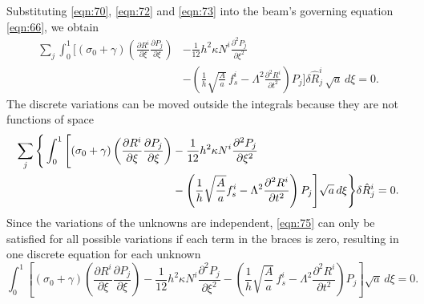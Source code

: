 \documentclass[12pt,MSc,twoside]{muthesis_2020}
\begin{document}
Substituting \eqref{eqn:70}, \eqref{eqn:72} and \eqref{eqn:73} into the beam's governing equation \eqref{eqn:66}, we obtain 
\begin{equation}
	\label{eqn:74}
    \begin{aligned}
	\sum_j\int^1_0 \Bigg[(\sigma_0+\gamma)\left(\frac{\partial R^i}{\partial\xi}\frac{\partial P_j}{\partial\xi}\right)&-\frac{1}{12}h^2\kappa N^i \frac{\partial^2 P_j}{\partial\xi^2}\\
 &-\left(\frac{1}{h}\sqrt{\frac{A}{a}}\,f^i_{s}-\Lambda^2\frac{\partial^2 R^i}{\partial t^2}
	\right)P_j
	\Bigg]\delta\hat{R}_j^i\,\sqrt{a}\,d\xi=0.
    \end{aligned}
\end{equation}
The discrete variations can be moved outside the integrals because they are not functions of space
\begin{align}
    \label{eqn:75}
    \sum_j \Bigg\{ \int_0^1 \Bigg[(\sigma_0+\gamma) \left( \frac{\partial R^i}{\partial \xi} \frac{\partial P_j}{\partial \xi} \right) 
    &- \frac{1}{12} h^2 \kappa N^i \frac{\partial^2 P_j}{\partial \xi^2} \notag \\
    &- \left( \frac{1}{h} \sqrt{\frac{A}{a}} f^i_{s} - \Lambda^2 \frac{\partial^2 R^i}{\partial t^2} \right) P_j
    \Bigg] \sqrt{a} \, d\xi \Bigg\} \delta \hat{R}_j^i = 0.
\end{align}
Since the variations of the unknowns are independent, \eqref{eqn:75} can only be satisfied for all possible variations if each term in the braces is zero, resulting in one discrete equation for each unknown
\begin{equation}
	\label{eqn:76}
	\int^1_0 \left[(\sigma_0+\gamma)\left(\frac{\partial R^i}{\partial\xi}\frac{\partial P_j}{\partial\xi}\right)-\frac{1}{12}h^2\kappa N^i \frac{\partial^2 P_j}{\partial\xi^2}-\left(\frac{1}{h}\sqrt{\frac{A}{a}}\,f^i_{s}-\Lambda^2\frac{\partial^2 R^i}{\partial t^2}
	\right)P_j
	\right]\sqrt{a}\,d\xi=0.
\end{equation}
\end{document}
